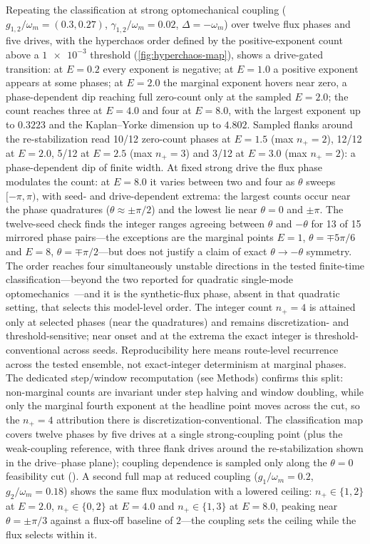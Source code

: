 \documentclass[preprint,numbers,a4paper]{elsarticle}
\begin{document}
Repeating the classification at strong optomechanical coupling ($g_{1,2}/\omega_m=(\num{0.3},\num{0.27})$, $\gamma_{1,2}/\omega_m=\num{0.02}$, $\Delta=-\omega_m$) over twelve flux phases and five drives, with the hyperchaos order defined by the positive-exponent count above a $\num{1e-3}$ threshold (\cref{fig:hyperchaos-map}), shows a drive-gated transition: at $E=\num{0.2}$ every exponent is negative; at $E=\num{1.0}$ a positive exponent appears at some phases; at $E=\num{2.0}$ the marginal exponent hovers near zero, a phase-dependent dip reaching full zero-count only at the sampled $E=\num{2.0}$; the count reaches three at $E=\num{4.0}$ and four at $E=\num{8.0}$, with the largest exponent up to $\num{0.3223}$ and the Kaplan--Yorke dimension up to $\num{4.802}$. Sampled flanks around the re-stabilization read \num{10}/\num{12} zero-count phases at $E=\num{1.5}$ (max $n_+=2$), \num{12}/\num{12} at $E=\num{2.0}$, \num{5}/\num{12} at $E=\num{2.5}$ (max $n_+=3$) and \num{3}/\num{12} at $E=\num{3.0}$ (max $n_+=2$): a phase-dependent dip of finite width. At fixed strong drive the flux phase modulates the count: at $E=\num{8.0}$ it varies between two and four as $\theta$ sweeps $[-\pi,\pi)$, with seed- and drive-dependent extrema: the largest counts occur near the phase quadratures ($\theta\approx\pm\pi/2$) and the lowest lie near $\theta=0$ and $\pm\pi$. The twelve-seed check finds the integer ranges agreeing between $\theta$ and $-\theta$ for \num{13} of \num{15} mirrored phase pairs---the exceptions are the marginal points $E=\num{1}$, $\theta=\mp5\pi/6$ and $E=\num{8}$, $\theta=\mp\pi/2$---but does not justify a claim of exact $\theta\to-\theta$ symmetry. The order reaches four simultaneously unstable directions in the tested finite-time classification---beyond the two reported for quadratic single-mode optomechanics~\cite{HalefShomroni2025}---and it is the synthetic-flux phase, absent in that quadratic setting, that selects this model-level order. The integer count $n_+=4$ is attained only at selected phases (near the quadratures) and remains discretization- and threshold-sensitive; near onset and at the extrema the exact integer is threshold-conventional across seeds. Reproducibility here means route-level recurrence across the tested ensemble, not exact-integer determinism at marginal phases. The dedicated step/window recomputation (see Methods) confirms this split: non-marginal counts are invariant under step halving and window doubling, while only the marginal fourth exponent at the headline point moves across the cut, so the $n_+=4$ attribution there is discretization-conventional. The classification map covers twelve phases by five drives at a single strong-coupling point (plus the weak-coupling reference, with three flank drives around the re-stabilization shown in the drive--phase plane); coupling dependence is sampled only along the $\theta=0$ feasibility cut (). A second full map at reduced coupling ($g_1/\omega_m=\num{0.2}$, $g_2/\omega_m=\num{0.18}$) shows the same flux modulation with a lowered ceiling: $n_+\in\{1,2\}$ at $E=\num{2.0}$, $n_+\in\{0,2\}$ at $E=\num{4.0}$ and $n_+\in\{1,3\}$ at $E=\num{8.0}$, peaking near $\theta=\pm\pi/3$ against a flux-off baseline of $2$---the coupling sets the ceiling while the flux selects within it.
\end{document}
